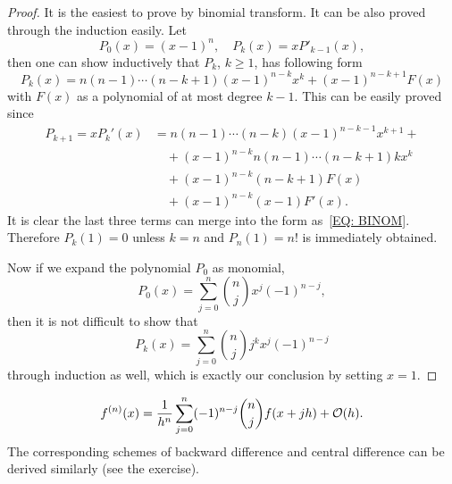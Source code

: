 \begin{proof}
    It is the easiest to prove by binomial transform. It can be also proved through the induction easily. Let 
    $$P_0(x) = (x - 1)^n,\quad P_k(x) =  x P'_{k-1}(x) ,$$
    then one can show inductively that $P_k$, $k\ge 1$, has following form
    \begin{equation}\label{EQ: BINOM}
        P_k(x) = n(n-1)\cdots (n-k+1) (x - 1)^{n-k} x^k  + (x-1)^{n-k+1} F(x)
    \end{equation}
    with $F(x)$ as a polynomial of at most degree $k-1$. This can be easily proved since 
    \begin{equation}
        \begin{aligned}
           P_{k+1} =  x P_k'(x) &= n(n-1)\cdots (n-k)(x-1)^{n-k-1} x^{k+1} + \\&\quad +   (x-1)^{n-k} { n(n-1)\cdots (n-k+1) k x^k}  \\
           &\quad + (x-1)^{n-k} {(n-k+1)  F(x)}\\
           &\quad+(x-1)^{n-k} {(x-1)F'(x)}.
        \end{aligned}
    \end{equation}
    It is clear the last three terms can merge into the form as~\eqref{EQ: BINOM}. Therefore $P_k(1) = 0$ unless $k = n$ and $P_n(1) = n!$ is immediately obtained. 

    Now if we expand the polynomial $P_0$ as monomial, 
    \begin{equation}
        P_0(x)=\sum_{j=0}^n \binom{n}{j} x^j (-1)^{n-j}, 
    \end{equation}
    then it is not difficult to show that 
    $$P_k(x) = \sum_{j=0}^n \binom{n}{j} j^k x^j (-1)^{n-j}$$
    through induction as well, which is exactly our conclusion by setting $x = 1$.
\end{proof}
\begin{theorem}\label{THM: FORWARD FD}
    $$f^{(n)}(x) = \frac{1}{h^n}\sum_{j=0}^n (-1)^{n-j} \binom{n}{j} f(x + j h) + \mathcal O(h).$$
    The corresponding schemes of backward difference and central difference can be derived similarly (see the exercise).
\end{theorem}
